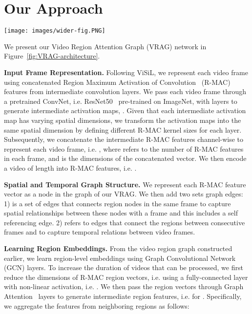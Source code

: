 \documentclass[letterpaper]{article} \usepackage{aaai22}  \usepackage{times}  \usepackage{helvet}  \usepackage{courier}  \usepackage[hyphens]{url}  \usepackage{graphicx} \urlstyle{rm} \usepackage{amsmath}
\begin{document}
\section{Our Approach}
\begin{figure*}[t]
    \centering
    \texttt{[image: images/wider-fig.PNG]}
    \caption{Our Video Region Attention Graph Network (VRAG). (Left) Graph structure. (Right) VRAG Network.}
    \label{fig:VRAG-architecture}
\end{figure*}

We present our Video Region Attention Graph (VRAG) network in Figure~\ref{fig:VRAG-architecture}. 

\textbf{\label{sect:frame-repr}Input Frame Representation.} Following ViSiL, we represent each video frame using concatenated Region Maximum Activation of Convolution~\cite{rmac} (R-MAC) features from intermediate convolution layers. We pass each video frame through a pretrained ConvNet, i.e. ResNet50~\cite{resnet} pre-trained on ImageNet, with  layers to generate intermediate activation maps, . Given that each intermediate activation map  has varying spatial dimensions, we transform the activation maps into the same spatial dimension by defining different R-MAC kernel sizes for each layer. Subsequently, we concatenate the intermediate R-MAC features channel-wise to represent each video frame, i.e. , where  refers to the number of R-MAC features in each frame, and 
 is the dimensions of the concatenated vector. We then encode a video of length  into  R-MAC features, i.e. .

\textbf{Spatial and Temporal Graph Structure.}
We represent each R-MAC feature vector  as a node  in the graph  of our VRAG.
We then add two sets graph edges: 1)  is a set of edges that connects region nodes in the same frame  to capture spatial relationships between these nodes with a frame and this includes a self referencing edge. 2)  refers to edges that connect the regions between consecutive frames  and  to capture temporal relations between video frames. 

\textbf{Learning Region Embeddings.} From the video region graph  constructed earlier, we learn region-level embeddings using Graph Convolutional Network~\cite{gcn, graph-attention} (GCN) layers. To increase the duration of videos that can be processed, we first reduce the dimensions of R-MAC region vectors, i.e.  using a fully-connected layer with non-linear activation, i.e. .
We then pass the region vectors through  Graph Attention~\cite{graph-attention} layers to generate intermediate region features, i.e.  for . Specifically, we aggregate the features from neighboring regions as follows: 
\end{document}
